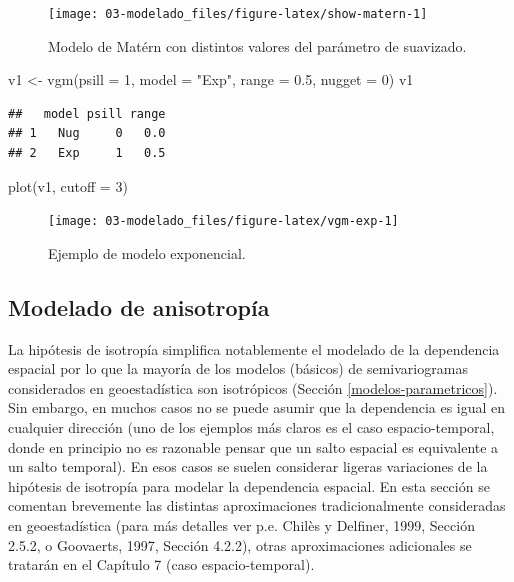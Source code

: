 \documentclass[
  spanish,
]{book}
\newenvironment{Shaded}{\begin{snugshade}}{\end{snugshade}}
\newcommand{\AttributeTok}[1]{\textcolor[rgb]{0.77,0.63,0.00}{#1}}
\newcommand{\DecValTok}[1]{\textcolor[rgb]{0.00,0.00,0.81}{#1}}
\newcommand{\FloatTok}[1]{\textcolor[rgb]{0.00,0.00,0.81}{#1}}
\newcommand{\FunctionTok}[1]{\textcolor[rgb]{0.00,0.00,0.00}{#1}}
\newcommand{\NormalTok}[1]{#1}
\newcommand{\OtherTok}[1]{\textcolor[rgb]{0.56,0.35,0.01}{#1}}
\newcommand{\StringTok}[1]{\textcolor[rgb]{0.31,0.60,0.02}{#1}}
\theoremstyle{break}
\theoremstyle{definition}
\theoremstyle{definition}
\theoremstyle{definition}
\theoremstyle{definition}
\theoremstyle{remark}
\begin{document}
\begin{figure}[!htb]

{\centering \texttt{[image: 03-modelado\_files/figure-latex/show-matern-1]} 

}

\caption{Modelo de Matérn con distintos valores del parámetro de suavizado.}\label{fig:show-matern}
\end{figure}

\begin{Shaded}
\begin{Highlighting}[]
\NormalTok{v1 }\OtherTok{\textless{}{-}} \FunctionTok{vgm}\NormalTok{(}\AttributeTok{psill =} \DecValTok{1}\NormalTok{, }\AttributeTok{model =} \StringTok{"Exp"}\NormalTok{, }\AttributeTok{range =} \FloatTok{0.5}\NormalTok{, }\AttributeTok{nugget =} \DecValTok{0}\NormalTok{)}
\NormalTok{v1}
\end{Highlighting}
\end{Shaded}

\begin{verbatim}
##   model psill range
## 1   Nug     0   0.0
## 2   Exp     1   0.5
\end{verbatim}

\begin{Shaded}
\begin{Highlighting}[]
\FunctionTok{plot}\NormalTok{(v1, }\AttributeTok{cutoff =} \DecValTok{3}\NormalTok{)}
\end{Highlighting}
\end{Shaded}

\begin{figure}[!htb]

{\centering \texttt{[image: 03-modelado\_files/figure-latex/vgm-exp-1]} 

}

\caption{Ejemplo de modelo exponencial.}\label{fig:vgm-exp}
\end{figure}

\hypertarget{anisotropia}{%
\subsection{Modelado de anisotropía}\label{anisotropia}}

La hipótesis de isotropía simplifica notablemente el modelado de la dependencia espacial por lo que la mayoría de los modelos (básicos) de semivariogramas considerados en geoestadística son isotrópicos (Sección \ref{modelos-parametricos}).
Sin embargo, en muchos casos no se puede asumir que la dependencia es igual en cualquier dirección (uno de los ejemplos más claros es el caso espacio-temporal, donde en principio no es razonable pensar que un salto espacial es equivalente a un salto temporal).
En esos casos se suelen considerar ligeras variaciones de la hipótesis de isotropía para modelar la dependencia espacial.
En esta sección se comentan brevemente las distintas aproximaciones tradicionalmente consideradas en geoestadística (para más detalles ver p.e. Chilès y Delfiner, 1999, Sección 2.5.2, o Goovaerts, 1997, Sección 4.2.2), otras aproximaciones adicionales se tratarán en el Capítulo 7 (caso espacio-temporal).
\end{document}
